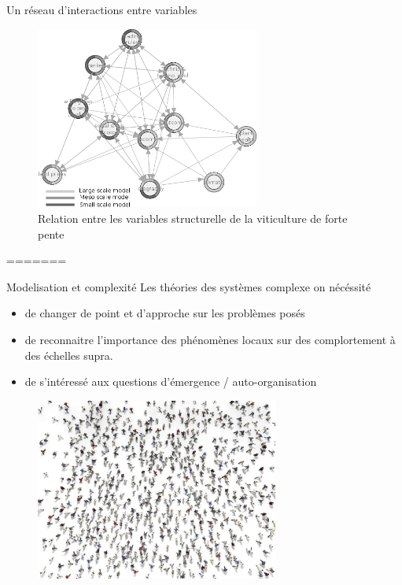 \documentclass[newPxFont]{beamer}
\begin{document}
\begin{frame}[c]{Un réseau d'interactions entre variables}
  \vspace{-2em}
  \begin{figure}
   \includegraphics[height=6cm]{img/a_igraph_variables_structurelle.png}
   \caption{Relation entre les variables structurelle de la viticulture de forte pente}
  \end{figure}
\end{frame}

=======
\begin{frame}[c]{Modelisation et complexité}
\vspace{-2em}
Les théories des systèmes complexe on nécéssité
\begin{itemize}
  \item de changer de point et d'approche sur les problèmes posés
  \item de reconnaitre l'importance des phénomènes locaux sur des complortement à des échelles supra.
  \item de s'intéressé aux questions d'émergence / auto-organisation
\end{itemize}
\begin{figure}
 \includegraphics[height=6cm]{img/a_crowd.jpg}
\end{figure}
\end{frame}
\end{document}
